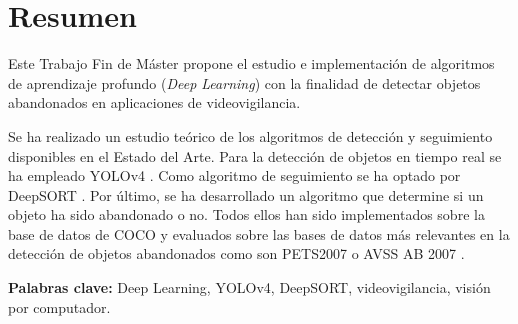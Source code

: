 
\chapter*{Resumen}
\label{cha:resumen}


Este Trabajo Fin de Máster propone el estudio e implementación de algoritmos de aprendizaje profundo (\textit{Deep Learning}) con la finalidad de detectar objetos abandonados en aplicaciones de videovigilancia.

Se ha realizado un estudio teórico de los algoritmos de detección y seguimiento disponibles en el Estado del Arte. Para la detección de objetos en tiempo real se ha empleado YOLOv4 \cite{bochkovskiy2020yolov4}. Como algoritmo de seguimiento se ha optado por DeepSORT \cite{Wojke2017simple}. Por último, se ha desarrollado un algoritmo que determine si un objeto ha sido abandonado o no. Todos ellos han sido implementados sobre la base de datos de COCO \cite{lin2015microsoft} y evaluados sobre las bases de datos más relevantes en la detección de objetos abandonados como son PETS2007 \cite{pets2007-dataset} o AVSS AB 2007 \cite{AVSSAB2007-dataset}.

\textbf{Palabras clave:} Deep Learning, YOLOv4, DeepSORT, videovigilancia, visión por computador.
